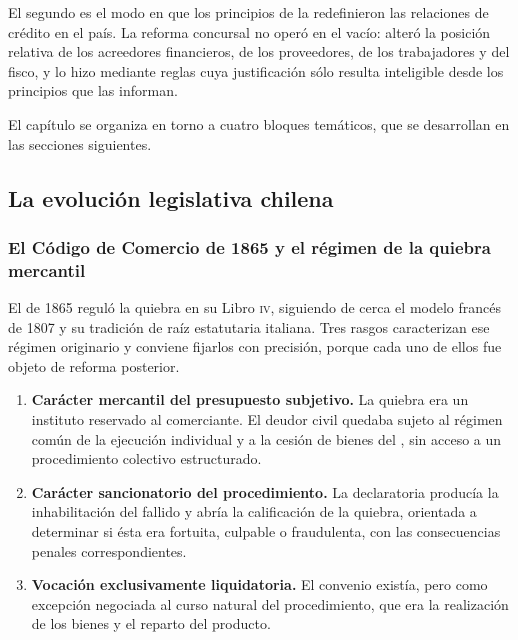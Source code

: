 El segundo es el modo en que los principios de la \LIR{} redefinieron las relaciones de
crédito en el país. La reforma concursal no operó en el vacío: alteró la posición
relativa de los acreedores financieros, de los proveedores, de los trabajadores y del
fisco, y lo hizo mediante reglas cuya justificación sólo resulta inteligible desde los
principios que las informan.

\bloqueNormativo

El capítulo se organiza en torno a cuatro bloques temáticos, que se desarrollan en las
secciones siguientes.

\subsection{La evolución legislativa chilena}

\subsubsection{El Código de Comercio de 1865 y el régimen de la quiebra mercantil}

El \ccom{} de 1865 reguló la quiebra en su Libro \textsc{iv}, siguiendo de cerca el
modelo francés de 1807 y su tradición de raíz estatutaria italiana. Tres rasgos
caracterizan ese régimen originario y conviene fijarlos con precisión, porque cada uno
de ellos fue objeto de reforma posterior.

\begin{enumerate}
  \item \textbf{Carácter mercantil del presupuesto subjetivo.} La quiebra era un
  instituto reservado al comerciante. El deudor civil quedaba sujeto al régimen común de
  la ejecución individual y a la cesión de bienes del \cc{}, sin acceso a un
  procedimiento colectivo estructurado.

  \item \textbf{Carácter sancionatorio del procedimiento.} La declaratoria producía la
  inhabilitación del fallido y abría la calificación de la quiebra, orientada a
  determinar si ésta era fortuita, culpable o fraudulenta, con las consecuencias penales
  correspondientes.

  \item \textbf{Vocación exclusivamente liquidatoria.} El convenio existía, pero como
  excepción negociada al curso natural del procedimiento, que era la realización de los
  bienes y el reparto del producto.
\end{enumerate}

